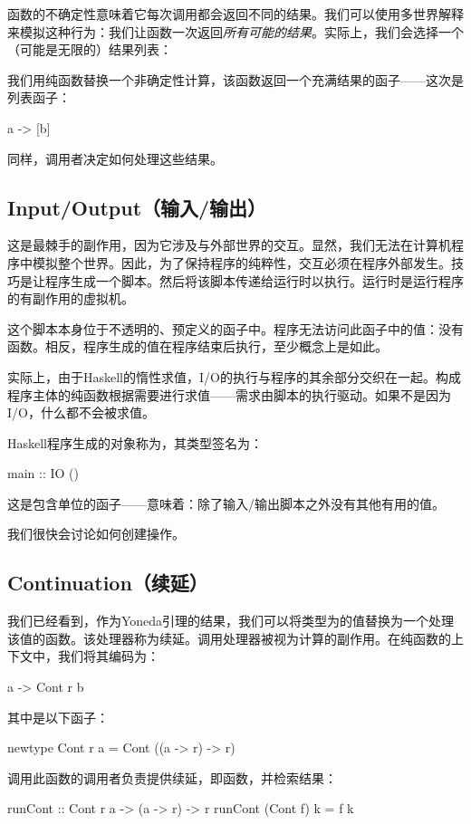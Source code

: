 \documentclass[DaoFP]{subfiles}
\begin{document}
    函数的不确定性意味着它每次调用都会返回不同的结果。我们可以使用多世界解释来模拟这种行为：我们让函数一次返回\emph{所有可能的结果}。实际上，我们会选择一个（可能是无限的）结果列表：

    我们用纯函数替换一个非确定性计算，该函数返回一个充满结果的函子——这次是列表函子：
    \begin{haskell}
        a -> [b]
    \end{haskell}
    同样，调用者决定如何处理这些结果。

    \subsection{Input/Output（输入/输出）}

    这是最棘手的副作用，因为它涉及与外部世界的交互。显然，我们无法在计算机程序中模拟整个世界。因此，为了保持程序的纯粹性，交互必须在程序外部发生。技巧是让程序生成一个脚本。然后将该脚本传递给运行时以执行。运行时是运行程序的有副作用的虚拟机。

    这个脚本本身位于不透明的、预定义的函子中。程序无法访问此函子中的值：没有函数。相反，程序生成的值在程序结束后执行，至少概念上是如此。

    实际上，由于Haskell的惰性求值，I/O的执行与程序的其余部分交织在一起。构成程序主体的纯函数根据需要进行求值——需求由脚本的执行驱动。如果不是因为I/O，什么都不会被求值。

    Haskell程序生成的对象称为，其类型签名为：
    \begin{haskell}
        main :: IO ()
    \end{haskell}
    这是包含单位的函子——意味着：除了输入/输出脚本之外没有其他有用的值。

    我们很快会讨论如何创建操作。

    \subsection{Continuation（续延）}

    我们已经看到，作为Yoneda引理的结果，我们可以将类型为的值替换为一个处理该值的函数。该处理器称为续延。调用处理器被视为计算的副作用。在纯函数的上下文中，我们将其编码为：
    \begin{haskell}
        a -> Cont r b
    \end{haskell}
    其中是以下函子：
    \begin{haskell}
        newtype Cont r a = Cont ((a -> r) -> r)
    \end{haskell}
    调用此函数的调用者负责提供续延，即函数，并检索结果：
    \begin{haskell}
        runCont :: Cont r a -> (a -> r) -> r
        runCont (Cont f) k = f k
    \end{haskell}
\end{document}
